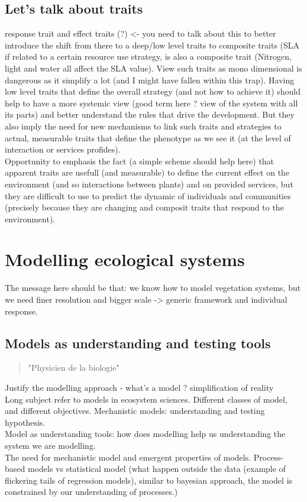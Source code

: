 \section{Let's talk about traits} %
response trait and effect traits (?) <- you need to talk about this to better introduce the shift from there to a deep/low level traits to composite traits (SLA if related to a certain resource use strategy, is also a composite trait (Nitrogen, light and water all affect the SLA value). View such traits as mono dimensional is dangerous as it simplify a lot (and I might have fallen within this trap). Having low level traits that define the overall strategy (and not how to achieve it) should help to have a more systemic view (good term here ? view of the system with all its parts) and better understand the rules that drive the development. But they also imply the need for new mechanisms to link such traits and strategies to actual, measurable traits that define the phenotype as we see it (at the level of interaction or services profides). \\
Opportunity to emphasis the fact (a simple scheme should help here) that apparent traits are usefull (and measurable) to define the current effect on the environment (and so interactions between plants) and on provided services, but they are difficult to use to predict the dynamic of individuals and communities (precisely because they are changing and composit traits that respond to the environment).



\chapter{Modelling ecological systems}
The message here should be that: we know how to model vegetation systems, but we need finer resolution and bigger scale -> generic framework and individual response.

\section{Models as understanding and testing tools}

\begin{quote}
"Physicien de la biologie"
\end{quote}
Justify the modelling approach - what's a model ? simplification of reality\\
Long subject refer to models in ecosystem sciences. Different classes of model, and different objectives. Mechanistic models: understanding and testing hypothesis.\\
Model as understanding tools: how does modelling help us understanding the system we are modelling.\\
The need for mechanistic model and emergent properties of models. Process-based models vs statistical model (what happen outside the data (example of flickering tails of regression models), similar to bayesian approach, the model is constrained by our understanding of processes.) \\

